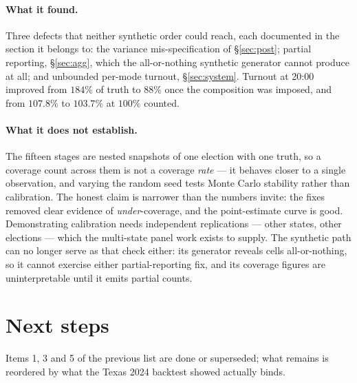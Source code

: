 \documentclass[11pt]{article}
\begin{document}
\paragraph{What it found.} Three defects that neither synthetic order could reach, each
documented in the section it belongs to: the variance mis-specification of
\S\ref{sec:post}; partial reporting, \S\ref{sec:agg}, which the all-or-nothing synthetic
generator cannot produce at all; and unbounded per-mode turnout, \S\ref{sec:system}.
Turnout at 20:00 improved from $184\%$ of truth to $88\%$ once the composition was
imposed, and from $107.8\%$ to $103.7\%$ at $100\%$ counted.

\paragraph{What it does not establish.} The fifteen stages are nested snapshots of one
election with one truth, so a coverage count across them is not a coverage \emph{rate} ---
it behaves closer to a single observation, and varying the random seed tests Monte Carlo
stability rather than calibration. The honest claim is narrower than the numbers invite:
the fixes removed clear evidence of \emph{under}-coverage, and the point-estimate curve is
good. Demonstrating calibration needs independent replications --- other states, other
elections --- which the multi-state panel work exists to supply. The synthetic path can no
longer serve as that check either: its generator reveals cells all-or-nothing, so it cannot
exercise either partial-reporting fix, and its coverage figures are uninterpretable until
it emits partial counts.

\section{Next steps}

Items 1, 3 and 5 of the previous list are done or superseded; what remains is reordered by
what the Texas 2024 backtest showed actually binds.
\end{document}
